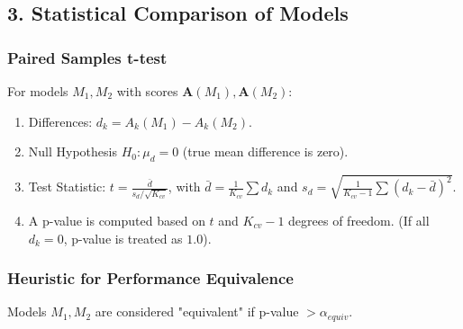 \documentclass{article}
\newcommand{\vecbf}[1]{\bm{#1}} %
\begin{document}
\subsection*{3. Statistical Comparison of Models}
\subsubsection*{Paired Samples t-test}
For models $M_1, M_2$ with scores $\vecbf{A}(M_1), \vecbf{A}(M_2)$:
\begin{enumerate}
    \item Differences: $d_k = A_k(M_1) - A_k(M_2)$.
    \item Null Hypothesis $H_0: \mu_d = 0$ (true mean difference is zero).
    \item Test Statistic: $t = \frac{\bar{d}}{s_d / \sqrt{K_{cv}}}$, with $\bar{d} = \frac{1}{K_{cv}}\sum d_k$ and $s_d = \sqrt{\frac{1}{K_{cv}-1}\sum (d_k - \bar{d})^2}$.
    \item A p-value is computed based on $t$ and $K_{cv}-1$ degrees of freedom. (If all $d_k=0$, p-value is treated as $1.0$).
\end{enumerate}

\subsubsection*{Heuristic for Performance Equivalence}
Models $M_1, M_2$ are considered "equivalent" if p-value $ > \alpha_{equiv}$.
\end{document}
